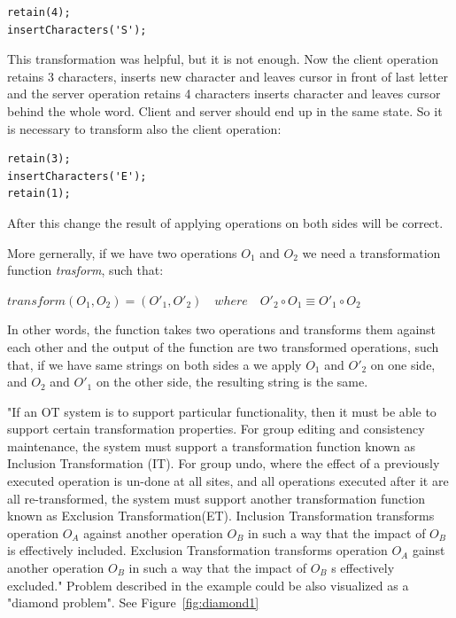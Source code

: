 \documentclass[12pt,oneside]{fithesis2}
\begin{document}
\vspace{3mm}
\begin{verbatim}
retain(4);
insertCharacters('S');
\end{verbatim}
\vspace{3mm}
This transformation was helpful, but it is not enough. Now the client operation retains 3 characters, inserts new character and leaves cursor in front of last letter and the server operation retains 4 characters inserts character and leaves cursor behind the whole word. Client and server should end up in the same state. So it is necessary to transform also the client operation: 
\vspace{3mm}
\begin{verbatim}
retain(3);
insertCharacters('E');
retain(1);
\end{verbatim}
\vspace{3mm}
After this change the result of applying operations on both sides will be correct.\par More gernerally, if we have two operations \(O_{1}\) and  \(O_{2}\) we need a transformation function \textit{trasform}, such that: 
\begin{center}
\(transform(O_{1},O_{2}) = (O'_{1},O'_{2}) \quad where \quad O'_{2} \circ O_{1} \equiv O'_{1} \circ O_{2} \) 
\end{center}
In other words, the function takes two operations and transforms them against each other and the output of the function are two transformed operations, such that, if we have same strings on both sides a we apply \( O_{1} \) and \(O'_{2}\) on one side, and \( O_{2} \) and  \( O'_{1} \) on the other side, the resulting string is the same. 
\par "If an OT system is to support particular functionality, then it must be able to support certain transformation properties. For group editing and consistency maintenance, the system must support a transformation function known as Inclusion Transformation (IT). For group undo, where the effect of a previously executed operation is un-done at all sites, and all operations executed after it are all re-transformed, the system must support another transformation function known as Exclusion Transformation(ET). Inclusion Transformation transforms operation \( O_{A} \) against another operation \( O_{B} \) in such a way that the impact of \( O_{B} \) is effectively included. Exclusion Transformation transforms operation \( O_{A} \) gainst another operation \( O_{B} \) in such a way that the impact of \( O_{B} \) s effectively excluded." \cite{Leung} Problem described in the example could be also visualized as a "diamond problem". See Figure~\ref{fig:diamond1}
\end{document}
